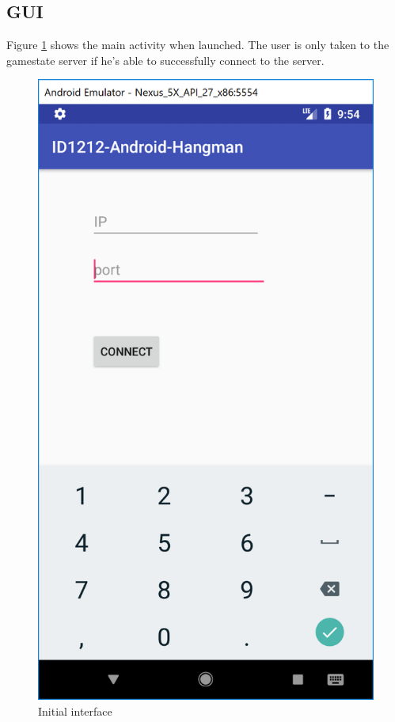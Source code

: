 \documentclass[a4paper]{scrartcl}
\begin{document}
\subsection{GUI}

Figure \ref{fig:a1} shows the main activity when launched. 
The user is only taken to the gamestate server if he's able to successfully connect to the server.

\begin{figure}[h!]
  \begin{center}
    \includegraphics[scale=0.5]{Activity1.png}
    \caption{Initial interface}
    \label{fig:a1}
  \end{center}
\end{figure}
\end{document}
